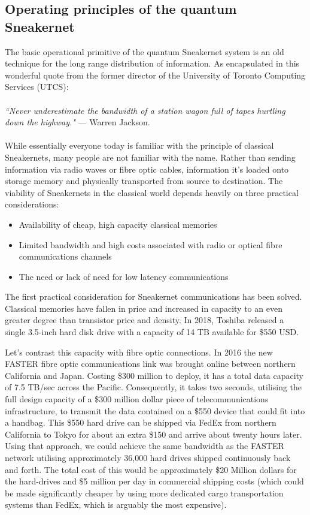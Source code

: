 \documentclass[twocolumn, aps, rmp, amsmath, amssymb, nofootinbib, superscriptaddress, longbibliography, floatfix, table-of-contents, eqsecnum]{revtex4-2}
\newcommand{\famousquote}[2]{\noindent\textit{``#1"} --- #2.\index{Quotes}\index{#2}}
\begin{document}
\subsection{Operating principles of the quantum Sneakernet}

The basic operational primitive of the quantum Sneakernet system is an old technique for the long range distribution of information. As encapsulated in this wonderful quote from the former director of the University of Toronto Computing Services (UTCS):
\\
\\
\famousquote{Never underestimate the bandwidth of a station wagon full of tapes hurtling down the highway.}{Warren Jackson}
\\
\\
While essentially everyone today is familiar with the principle of classical Sneakernets, many people are not familiar with the name. Rather than sending information via radio waves or fibre optic cables, information it's loaded onto storage memory and physically transported from source to destination. The viability of Sneakernets in the classical world depends heavily on three practical considerations:
\begin{itemize}
\item Availability of cheap, high capacity classical memories
\item Limited bandwidth and high costs associated with radio or optical fibre communications channels
\item The need or lack of need for low latency communications 
\end{itemize}
The first practical consideration for Sneakernet communications has been solved. Classical memories have fallen in price and increased in capacity to an even greater degree than transistor price and density. In 2018, Toshiba released a single 3.5-inch hard disk drive with a capacity of 14 TB available for \$550 USD. 

Let's contrast this capacity with fibre optic connections. In 2016 the new FASTER fibre optic communications link was brought online between northern California and Japan. Costing \$300 million to deploy, it has a total data capacity of 7.5 TB/sec across the Pacific. Consequently, it takes two seconds, utilising the full design capacity of a \$300 million dollar piece of telecommunications infrastructure, to transmit the data contained on a \$550 device that could fit into a handbag. This \$550 hard drive can be shipped via FedEx from northern California to Tokyo for about an extra \$150 and arrive about twenty hours later. Using that approach, we could achieve the same bandwidth as the FASTER network utilising approximately 36,000 hard drives shipped continuously back and forth. The total cost of this would be approximately \$20 Million dollars for the hard-drives and \$5 million per day in commercial shipping costs (which could be made significantly cheaper by using more dedicated cargo transportation systems than FedEx, which is arguably the most expensive).
\end{document}
